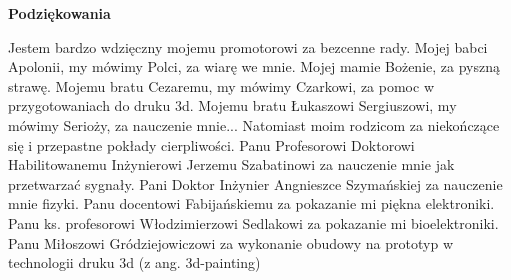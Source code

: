 \newpage
    \begin{center}
	{\large\bfseries Podziękowania}\par\bigskip\end{center}
Jestem bardzo wdzięczny	mojemu promotorowi za bezcenne rady.
Mojej babci Apolonii, my mówimy Polci, za wiarę we mnie.
Mojej mamie Bożenie, za pyszną strawę.
Mojemu bratu Cezaremu, my mówimy Czarkowi, za pomoc w przygotowaniach do druku 3d.
Mojemu bratu Łukaszowi Sergiuszowi, my mówimy Serioży, za nauczenie mnie...
Natomiast moim rodzicom za niekończące się i przepastne pokłady cierpliwości.
Panu Profesorowi Doktorowi Habilitowanemu Inżynierowi Jerzemu Szabatinowi za nauczenie mnie jak przetwarzać sygnały.
Pani Doktor Inżynier Angnieszce Szymańskiej za nauczenie mnie fizyki.
Panu docentowi Fabijańskiemu za pokazanie mi piękna elektroniki.
Panu ks. profesorowi Włodzimierzowi Sedlakowi za pokazanie mi bioelektroniki.
Panu Miłoszowi Gródziejowiczowi za wykonanie obudowy na prototyp w technologii druku 3d (z ang. 3d-painting)
